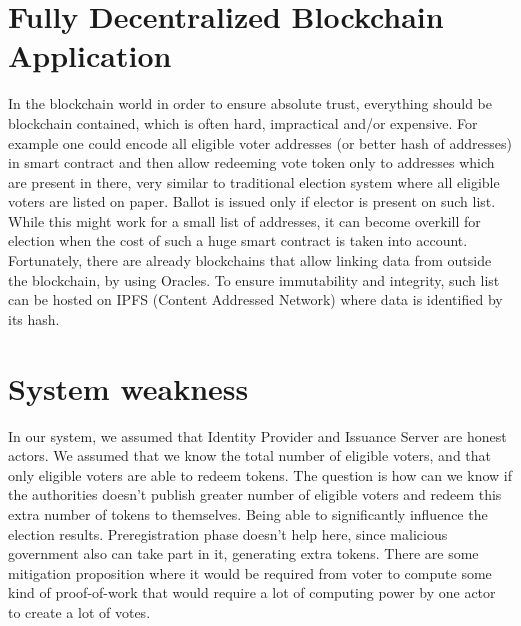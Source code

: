 \documentclass[runningheads]{llncs}
\begin{document}
\section{Fully Decentralized Blockchain Application}
In the blockchain world in order to ensure absolute trust, everything should be blockchain contained, which is often hard, impractical and/or expensive. For example one could encode all eligible voter addresses (or better hash of addresses) in smart contract and then allow redeeming vote token only to addresses which are present in there, very similar to traditional election system where all eligible voters are listed on paper. Ballot is issued only if elector is present on such list. While this might work for a small list of addresses, it can become overkill for election when the cost of such a huge smart contract is taken into account. Fortunately, there are already blockchains that allow linking data from outside the blockchain, by using Oracles. To ensure immutability and integrity, such list can be hosted on IPFS (Content Addressed Network) where data is identified by its hash.

\section{System weakness}
In our system, we assumed that Identity Provider and Issuance Server are honest actors. We assumed that we know the total number of eligible voters, and that only eligible voters are able to redeem tokens. The question is how can we know if the authorities doesn't publish greater number of eligible voters and redeem this extra number of tokens to themselves. Being able to significantly influence the election results. Preregistration phase doesn't help here, since malicious government also can take part in it, generating extra tokens. There are some mitigation proposition where it would be required from voter to compute some kind of proof-of-work that would require a lot of computing power by one actor to create a lot of votes.
\end{document}
